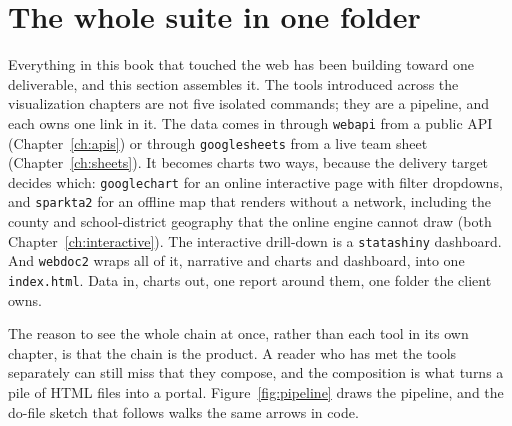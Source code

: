 \documentclass[
    a4paper,
    fontsize=10pt,
    twoside=true,
    numbers=noenddot,
]{kaobook}
\begin{document}
\section{The whole suite in one folder}\label{sec:capstone}
Everything in this book that touched the web has been building toward one deliverable, and this section assembles it. The tools introduced across the visualization chapters are not five isolated commands; they are a pipeline, and each owns one link in it. The data comes in through \texttt{webapi} from a public API (Chapter~\ref{ch:apis}) or through \texttt{googlesheets} from a live team sheet (Chapter~\ref{ch:sheets}). It becomes charts two ways, because the delivery target decides which: \texttt{googlechart} for an online interactive page with filter dropdowns, and \texttt{sparkta2} for an offline map that renders without a network, including the county and school-district geography that the online engine cannot draw (both Chapter~\ref{ch:interactive}). The interactive drill-down is a \texttt{statashiny} dashboard. And \texttt{webdoc2} wraps all of it, narrative and charts and dashboard, into one \texttt{index.html}. Data in, charts out, one report around them, one folder the client owns.

The reason to see the whole chain at once, rather than each tool in its own chapter, is that the chain is the product. A reader who has met the tools separately can still miss that they compose, and the composition is what turns a pile of HTML files into a portal. Figure~\ref{fig:pipeline} draws the pipeline, and the do-file sketch that follows walks the same arrows in code.
\end{document}
